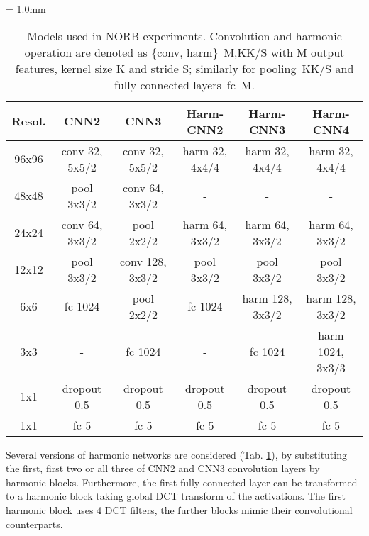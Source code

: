 \documentclass[12pt,a4paper]{article}
\begin{document}
\begin{table}[!t]
\tabcolsep = 1.0mm
\begin{center}
\caption{Models used in NORB experiments.
Convolution and harmonic operation are denoted as \{conv, harm\}~M,KK/S with M output features, kernel size K and stride S; similarly for pooling~KK/S and fully connected layers~fc~M.}
\label{tab:norb_nn}
\vspace{0.3\baselineskip}
\footnotesize
\begin{tabular}{cccccc}
\hline
\textbf{Resol.} & \textbf{CNN2} & \textbf{CNN3} & \textbf{Harm-CNN2}& \textbf{Harm-CNN3 }& \textbf{Harm-CNN4}\\
\hline
96x96 & conv 32, 5x5/2 & conv 32, 5x5/2 & harm 32, 4x4/4 & harm 32, 4x4/4 & harm 32, 4x4/4\\
48x48 & pool 3x3/2 & conv 64, 3x3/2 & - & - & - \\
24x24 & conv 64, 3x3/2 & pool 2x2/2 & harm 64, 3x3/2 & harm 64, 3x3/2& harm 64, 3x3/2 \\
12x12 & pool 3x3/2 & conv 128, 3x3/2 &  pool 3x3/2&pool 3x3/2&pool 3x3/2\\
6x6 & fc 1024 & pool 2x2/2 & fc 1024 & harm 128, 3x3/2 & harm 128, 3x3/2 \\
3x3 & - & fc 1024 & - & fc 1024 & harm 1024, 3x3/3 \\
1x1 & dropout 0.5 & dropout 0.5 & dropout 0.5& dropout 0.5& dropout 0.5\\
1x1 & fc 5 & fc 5 & fc 5& fc 5& fc 5\\
\hline
\end{tabular}
\end{center}
\end{table}

 Several versions of harmonic networks are considered (Tab. \ref{tab:norb_nn}), by substituting the first, first two or all three of CNN2 and CNN3 convolution layers by harmonic blocks. Furthermore, the first fully-connected layer can be transformed to a harmonic block taking global DCT transform of the activations. The first harmonic block uses 4 DCT filters, the further blocks mimic their convolutional counterparts.
\end{document}
